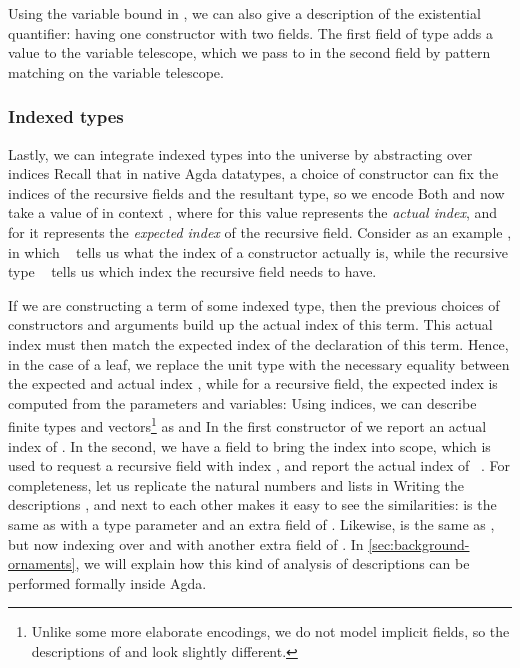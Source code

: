 Using the variable bound in , we can also give a description of the existential quantifier:
having one constructor with two fields. The first field of type  adds a value  to the variable telescope, which we pass to  in the second field by pattern matching on the variable telescope.


\subsubsection{Indexed types}\label{ssec:background-ix}
Lastly, we can integrate indexed types \cite{iir} into the universe by abstracting over indices
Recall that in native Agda datatypes, a choice of constructor can fix the indices of the recursive fields and the resultant type, so we encode
Both  and  now take a value of  in context , where for  this value represents the \emph{actual index}, and for  it represents the \emph{expected index} of the recursive field. Consider as an example , in which \  tells us what the index of a constructor actually is, while the recursive type \  tells us which index the recursive field needs to have.

If we are constructing a term of some indexed type, then the previous choices of constructors and arguments build up the actual index of this term. This actual index must then match the expected index of the declaration of this term. Hence, in the case of a leaf, we replace the unit type with the necessary equality between the expected  and actual index  \cite{algorn}, while for a recursive field, the expected index  is computed from the parameters and variables:
Using indices, we can describe finite types and vectors\footnote{Unlike some more elaborate encodings, we do not model implicit fields, so the descriptions of  and  look slightly different.} as
and
In the first constructor of  we report an actual index of . In the second, we have a field \bN{} to bring the index  into scope, which is used to request a recursive field with index , and report the actual index of \ . For completeness, let us replicate the natural numbers and lists in 
Writing the descriptions ,  and  next to each other makes it easy to see the similarities:  is the same as  with a type parameter and an extra field  of . Likewise,  is the same as , but now indexing over \bN{} and with another extra field  of \bN{}. In \autoref{sec:background-ornaments}, we will explain how this kind of analysis of descriptions can be performed formally inside Agda.

